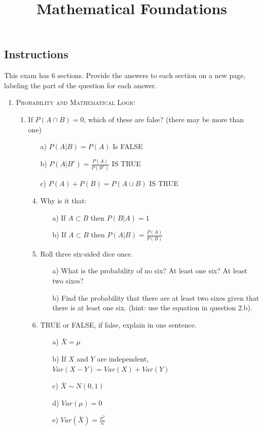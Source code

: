 \documentclass[11pt,letterpaper]{article}
\title{Mathematical Foundations}
\numberwithin{equation}{section}
\begin{document}
\maketitle
\subsection*{Instructions}
This exam has 6 sections.  Provide the answers to each section on a new page, labeling the part of the question for each answer.  
\begin{enumerate}[I]
\item \textsc{Probability and Mathematical Logic }
\begin{enumerate}[1)]
\item If $P(A\cap B)=0$, which of these are false? (there may be more than one)
\begin{enumerate}
\item[a)] $P(A|B)=P(A)$ Is FALSE
\item[b)] $P(A|B^c)=\frac{P(A)}{P(B^c)}$ IS TRUE
\item[c)] $P(A)+P(B)=P(A\cup B)$ IS TRUE

\item  Why is it that: 
\begin{enumerate}
\item[a)] If $A \subset B$ then $P(B|A) = 1$ 
\item[b)] If $A \subset B$ then $P(A|B) = \frac{P(A)}{P(B)}$
\end{enumerate}
\item Roll three six-sided dice once. 
\begin{enumerate}
\item[a)] What is the probability of no six?  At least one six?  At least two sixes?
\item[b)] Find the probability that there are at least two sixes given that there is at least one six. (hint: use the equation in question 2.b).
\end{enumerate}
\item TRUE or FALSE, if false, explain in one sentence.
\begin{enumerate}
\item[a)] $\bar{X}=\mu$
\item[b)] If $X$ and $Y$ are independent, $Var(X-Y)=Var(X)+Var(Y)$
\item[c)] $\bar{X}\sim N(0,1)$
\item[d)] $Var(\mu)=0$
\item[e)] $Var(\bar{X})=\frac{\sigma^2}{n}$
\end{enumerate}


\end{enumerate}
\end{enumerate}
\end{enumerate}
\end{document}
